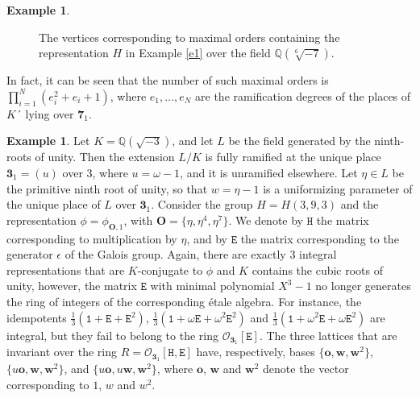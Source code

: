 \documentclass{article}
\theoremstyle{definition}
\newtheorem{ex}[prop]{Example}
\begin{document}
\begin{ex}
\begin{figure}[h!]
\begin{center}
\end{center}
\caption{The vertices corresponding to maximal orders
containing the representation $H$ in Example \ref{e1}
over the field $\mathbb{Q}(\sqrt[6]{-7})$.}\label{nbh1}
\end{figure}
In fact, it can be seen that the number of such maximal orders
is $\prod_{i=1}^N(e_i^2+e_i+1)$, where $e_1,\dots,e_N$ are the
ramification degrees of the places of $K´$ lying over 
$\mathbf{7}_1$.   
\end{ex}


\begin{ex}\label{e2}
   Let $K=\mathbb{Q}(\sqrt{-3})$, and let $L$ be the field generated 
   by the ninth-roots of unity. Then the extension $L/K$ is fully 
   ramified at the unique place $\mathbf{3}_1=(u)$ over $3$, where
   $u=\omega-1$, and it is unramified elsewhere.
   Let $\eta\in L$ be the primitive ninth root of unity,
   so that $w=\eta-1$ is a uniformizing parameter of
   the unique place of $L$ over $\mathbf{3}_1$.
   Consider the group $H=H(3,9,3)$ and the representation
   $\phi=\phi_{\mathbf{O},1}$, with 
   $\mathbf{O}=\{\eta,\eta^4,\eta^7\}$. 
   We denote by $\mathtt{H}$ the matrix corresponding to multiplication 
   by $\eta$, and by $\mathtt{E}$ the matrix corresponding to the 
   generator $\epsilon$ of the Galois group.
   Again, there are exactly $3$ integral representations that are 
   $K$-conjugate to $\phi$ and $K$ contains the cubic roots
   of unity, however, the matrix $\mathtt{E}$ with minimal polynomial
   $X^3-1$ no longer generates the ring of integers of
   the corresponding \'etale algebra. For instance,
   the idempotents  $\frac13(\mathtt{1}+\mathtt{E}+\mathtt{E}^2)$,
  $\frac13(\mathtt{1}+\omega\mathtt{E}+\omega^2\mathtt{E}^2)$
  and $\frac13(\mathtt{1}+\omega^2\mathtt{E}+\omega\mathtt{E}^2)$
  are integral, but they fail to belong to the ring
  $\mathcal{O}_{\mathbf{3}_1}[\mathtt{E}]$.
  The three lattices that are invariant over
  the ring $R=\mathcal{O}_{\mathbf{3}_1}[\mathtt{H},\mathtt{E}]$
  have, respectively, bases $\{\mathbf{o},\mathbf{w},\mathbf{w}^2\}$,
  $\{u\mathbf{o},\mathbf{w},\mathbf{w}^2\}$,
  and $\{u\mathbf{o},u\mathbf{w},\mathbf{w}^2\}$,
  where $\mathbf{o}$, $\mathbf{w}$ and $\mathbf{w}^2$
  denote the vector corresponding to $1$, $w$ and $w^2$.

\end{ex}
\end{document}

